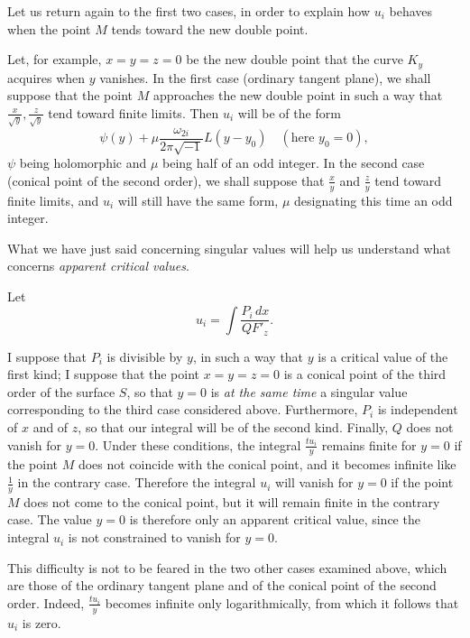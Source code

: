 \documentclass{article}
\begin{document}
Let us return again to the first two cases, in order to explain how $u_{i}$ behaves when the point $M$ tends toward the new double point.

Let, for example, $x = y = z = 0$ be the new double point that the curve $K_{y}$ acquires when $y$ vanishes. In the first case (ordinary tangent plane), we shall suppose that the point $M$ approaches the new double point in such a way that $\frac{x}{\sqrt{y}}, \frac{z}{\sqrt{y}}$ tend toward finite limits. Then $u_{i}$ will be of the form
\[
\psi(y) + \mu \frac{\omega_{2i}}{2\pi\sqrt{-1}} L(y - y_{0}) \quad (\text{here } y_{0} = 0),
\]
$\psi$ being holomorphic and $\mu$ being half of an odd integer. In the second case (conical point of the second order), we shall suppose that $\frac{x}{y}$ and $\frac{z}{y}$ tend toward
finite limits, and $u_{i}$ will still have the same form, $\mu$ designating this time an odd integer.

What we have just said concerning singular values will help us understand what concerns \emph{apparent critical values}.

Let
\[
u_{i} = \int \frac{P_{i}\,dx}{Q F'_{z}}.
\]

I suppose that $P_{i}$ is divisible by $y$, in such a way that $y$ is a critical value of the first kind; I suppose that the point $x = y = z = 0$ is a conical point of the third order of the surface $S$, so that $y = 0$ is \emph{at the same time} a singular value corresponding to the third case considered above. Furthermore, $P_{i}$ is independent of $x$ and of $z$, so that our integral will be of the second kind. Finally, $Q$ does not vanish for $y = 0$. Under these conditions, the integral $\frac{t u_{i}}{y}$ remains finite for $y = 0$ if the point $M$ does not coincide with the conical point, and it becomes infinite like $\frac{1}{y}$ in the contrary case. Therefore the integral $u_{i}$ will vanish for $y = 0$ if the point $M$ does not come to the conical point, but it will remain finite in the contrary case. The value $y = 0$ is therefore only an apparent critical value, since the integral $u_{i}$ is not constrained to vanish for $y = 0$.

This difficulty is not to be feared in the two other cases examined above, which are those of the ordinary tangent plane and of the conical point of the second order. Indeed, $\frac{t u_{i}}{y}$ becomes infinite only logarithmically, from which it follows that $u_{i}$ is zero.
\end{document}
